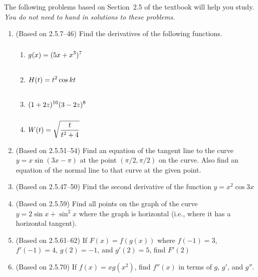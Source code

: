 \documentclass{article}
\title{\commonPSTitleZeroTwoFive}
\author{\commonAuthor}
\date{\commonDateZeroTwoFive}
\newcommand{\ds}{\displaystyle}
\begin{document}
\maketitle
\thispagestyle{empty}

\noindent
The following problems based on Section~2.5 of the textbook will help
you study.  \emph{You do not need to hand in solutions to these
  problems.}
\begin{enumerate}
\item (Based on 2.5.7--46) %
  Find the derivatives of the following functions.
  \begin{multicols}{4}
  \begin{enumerate}
  \item $\ds \vphantom{\sqrt{\frac{t}{t^2}}} g(x)=(5x+x^3)^7$
  \item $\ds \vphantom{\sqrt{\frac{t}{t^2}}} H(t) = t^2 \cos kt$
  \item $\ds \vphantom{\sqrt{\frac{t}{t^2}}} (1+2z)^{10}(3-2z)^8$
  \item $\ds \vphantom{\sqrt{\frac{t}{t^2}}} W(t)=\sqrt{\frac{t}{t^2+4}}$
  \end{enumerate}
  \end{multicols}
\item (Based on 2.5.51--54) %
  Find an equation of the tangent line to the curve $y=x\sin (3x-\pi)$
  at the point $(\pi/2,\pi/2)$ on the curve.  Also find an equation of
  the normal line to that curve at the given point.
\item (Based on 2.5.47--50) %
  Find the second derivative of the function $y=x^2\cos 3x$
\item (Based on 2.5.59) %
  Find all points on the graph of the curve $y=2\sin x + \sin^2 x$
  where the graph is horizontal (i.e., where it has a horizontal
  tangent).
\item (Based on 2.5.61--62) %
  If $F(x)=f(g(x))$ where $f(-1)=3$, $f'(-1)=4$, $g(2)=-1$, and
  $g'(2)=5$, find $F'(2)$
\item (Based on 2.5.70) %
  If $f(x)=xg(x^2)$, find $f''(x)$ in terms of $g$, $g'$, and $g''$.

\end{enumerate}
\end{document}
